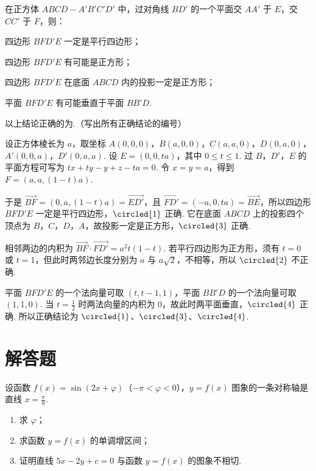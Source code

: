 \begin{problem}
在正方体 \(ABCD - A'B'C'D'\) 中，过对角线 \(BD'\) 的一个平面交 \(AA'\) 于 \(E\)，交 \(CC'\) 于 \(F\)，则：

\begin{circlelist}
\item 四边形 \(BFD'E\) 一定是平行四边形；
\item 四边形 \(BFD'E\) 有可能是正方形；
\item 四边形 \(BFD'E\) 在底面 \(ABCD\) 内的投影一定是正方形；
\item 平面 \(BFD'E\) 有可能垂直于平面 \(BB'D\).
\end{circlelist}

以上结论正确的为\fillinblank{}.（写出所有正确结论的编号）

\begin{solution}
设正方体棱长为 \(a\)，取坐标
\(A(0,0,0)\)，\(B(a,0,0)\)，\(C(a,a,0)\)，\(D(0,a,0)\)，\(A'(0,0,a)\)，\(D'(0,a,a)\). 设 \(E=(0,0,ta)\)，其中 \(0\leqslant t\leqslant1\). 过 \(B\)，\(D'\)，\(E\) 的平面方程可写为
\(tx+ty-y+z-ta=0\). 令 \(x=y=a\)，得到 \(F=(a,a,(1-t)a)\).

于是 \(\overrightarrow{BF}=(0,a,(1-t)a)=\overrightarrow{ED'}\)，且 \(\overrightarrow{FD'}=(-a,0,ta)=\overrightarrow{BE}\)，所以四边形 \(BFD'E\) 一定是平行四边形，\(\circled{1}\) 正确. 它在底面 \(ABCD\) 上的投影四个顶点为 \(B\)，\(C\)，\(D\)，\(A\)，故投影一定是正方形，\(\circled{3}\) 正确.

相邻两边的内积为 \(\overrightarrow{BF}\cdot\overrightarrow{FD'}=a^{2}t(1-t)\). 若平行四边形为正方形，须有 \(t=0\) 或 \(t=1\)，但此时两邻边长度分别为 \(a\) 与 \(a\sqrt2\)，不相等，所以 \(\circled{2}\) 不正确.

平面 \(BFD'E\) 的一个法向量可取 \((t,t-1,1)\)，平面 \(BB'D\) 的一个法向量可取 \((1,1,0)\). 当 \(t=\frac12\) 时两法向量的内积为 \(0\)，故此时两平面垂直，\(\circled{4}\) 正确. 所以正确结论为 \(\circled{1}\)、\(\circled{3}\)、\(\circled{4}\).
\end{solution}
\end{problem}

\section{解答题}
\begin{problem}
设函数 \(f(x) = \sin(2x + \varphi)\)（\(-\pi < \varphi < 0\)），\(y = f(x)\) 图象的一条对称轴是直线 \(x = \frac{\pi}{8}\).

\begin{enumerate}
\item 求 \(\varphi\)；
\item 求函数 \(y = f(x)\) 的单调增区间；
\item 证明直线 \(5x - 2y + c = 0\) 与函数 \(y = f(x)\) 的图象不相切.
\end{enumerate}
\end{problem}

